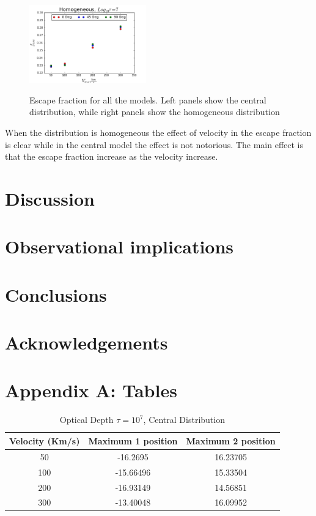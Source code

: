 \documentclass[usenatbib]{mn2e}
\begin{document}
\begin{figure}
  \includegraphics[width=0.45\textwidth]{FEHOM7.png}
  \label{figure:escape}\caption{Escape fraction for all the models. Left
    panels show the central distribution, while right panels show the
    homogeneous distribution} 
\end{figure}

When the distribution is homogeneous the effect of velocity in the
escape fraction is clear while in the central model the effect is not
notorious. 
The main effect is that the escape fraction increase as the velocity
increase.  


\section{Discussion}
\label{sec:discussion}

\section{Observational implications}


\section{Conclusions}

\section*{Acknowledgements}

\section*{Appendix A: Tables}

\begin{table}
\begin{center}
\begin{tabular}{ccc}\hline          
Velocity (Km/s) & Maximum 1 position & Maximum 2 position \\ \hline
50 & -16.2695 & 16.23705 \\ 
100 & -15.66496 & 15.33504 \\ 
200 & -16.93149 & 14.56851 \\ 
300 & -13.40048 & 16.09952 \\ \hline 
\end{tabular} 
\caption{Optical Depth $\tau= 10^{7}$, Central Distribution}
\end{center}
\end{table}
\end{document}
